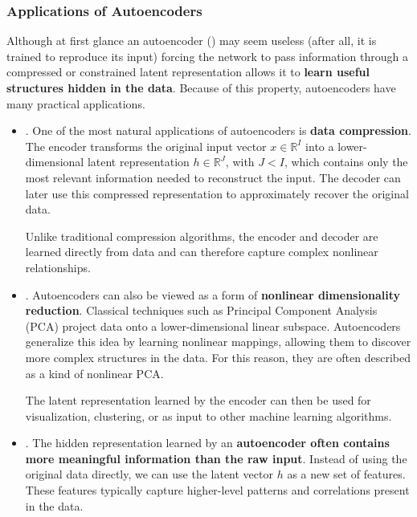 \subsubsection{Applications of Autoencoders}\label{sec:applications-of-autoencoders}

Although at first glance an autoencoder () may seem useless (after all, it is trained to reproduce its input) forcing the network to pass information through a compressed or constrained latent representation allows it to \textbf{learn useful structures hidden in the data}. Because of this property, autoencoders have many practical applications.
\begin{itemize}
    \item {}. One of the most natural applications of autoencoders is \textbf{data compression}. The encoder transforms the original input vector $x \in \mathbb{R}^{I}$ into a lower-dimensional latent representation $h \in \mathbb{R}^{J}$, with $J < I$, which contains only the most relevant information needed to reconstruct the input. The decoder can later use this compressed representation to approximately recover the original data.

    Unlike traditional compression algorithms, the encoder and decoder are learned directly from data and can therefore capture complex nonlinear relationships.
    
    
    \item {}. Autoencoders can also be viewed as a form of \textbf{nonlinear dimensionality reduction}. Classical techniques such as Principal Component Analysis (PCA) project data onto a lower-dimensional linear subspace. Autoencoders generalize this idea by learning nonlinear mappings, allowing them to discover more complex structures in the data. For this reason, they are often described as a kind of nonlinear PCA.

    The latent representation learned by the encoder can then be used for visualization, clustering, or as input to other machine learning algorithms.
    
    
    \item {}. The hidden representation learned by an \textbf{autoencoder often contains more meaningful information than the raw input}. Instead of using the original data directly, we can use the latent vector $h$ as a new set of features. These features typically capture higher-level patterns and correlations present in the data.
    

\end{itemize}
